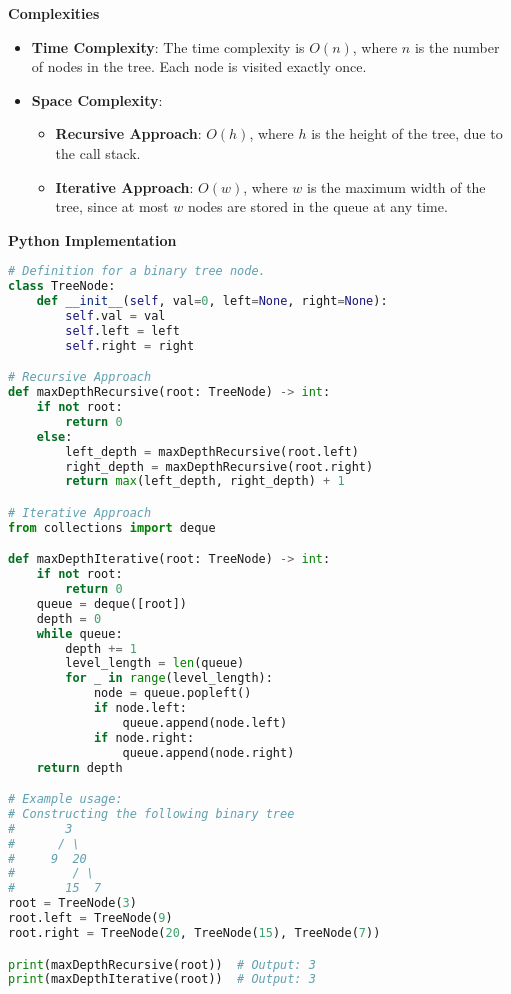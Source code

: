 \textbf{Complexities}

\begin{itemize}
    \item \textbf{Time Complexity}: The time complexity is \(O(n)\), where \(n\) is the number of nodes in the tree. Each node is visited exactly once.
    \item \textbf{Space Complexity}: 
    \begin{itemize}
        \item \textbf{Recursive Approach}: \(O(h)\), where \(h\) is the height of the tree, due to the call stack.
        \item \textbf{Iterative Approach}: \(O(w)\), where \(w\) is the maximum width of the tree, since at most \(w\) nodes are stored in the queue at any time.
    \end{itemize}
\end{itemize}

\textbf{Python Implementation}

\begin{lstlisting}[language=Python, xleftmargin=0.02\textwidth, xrightmargin=0.02\textwidth]
# Definition for a binary tree node.
class TreeNode:
    def __init__(self, val=0, left=None, right=None):
        self.val = val
        self.left = left
        self.right = right

# Recursive Approach
def maxDepthRecursive(root: TreeNode) -> int:
    if not root:
        return 0
    else:
        left_depth = maxDepthRecursive(root.left)
        right_depth = maxDepthRecursive(root.right)
        return max(left_depth, right_depth) + 1

# Iterative Approach
from collections import deque

def maxDepthIterative(root: TreeNode) -> int:
    if not root:
        return 0
    queue = deque([root])
    depth = 0
    while queue:
        depth += 1
        level_length = len(queue)
        for _ in range(level_length):
            node = queue.popleft()
            if node.left:
                queue.append(node.left)
            if node.right:
                queue.append(node.right)
    return depth

# Example usage:
# Constructing the following binary tree
#       3
#      / \
#     9  20
#        / \
#       15  7
root = TreeNode(3)
root.left = TreeNode(9)
root.right = TreeNode(20, TreeNode(15), TreeNode(7))

print(maxDepthRecursive(root))  # Output: 3
print(maxDepthIterative(root))  # Output: 3
\end{lstlisting}

